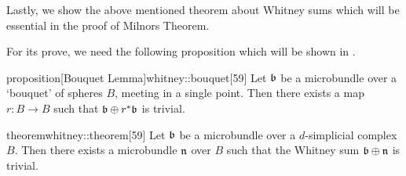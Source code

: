 \begin{myparagraph}
    Lastly, we show the above mentioned theorem about Whitney sums
    which will be essential in the proof of Milnors Theorem.

    For its prove, we need the following proposition
    which will be shown in .
\end{myparagraph}

\begin{mystatement}{proposition}[Bouquet Lemma]{whitney::bouquet}[59]
    Let $\bb$ be a microbundle over a `bouquet' of spheres $B$, meeting in a single point.
    Then there exists a map $r: B \to B$ such that $\whitney{\bb}{\ind{r}\bb}$ is trivial.
\end{mystatement}

\begin{mystatement}{theorem}{whitney::theorem}[59]
    Let $\bb$ be a microbundle over a $d$-simplicial complex $B$.
    Then there exists a microbundle $\mathfrak{n}$ over $B$ such that
    the Whitney sum $\whitney{\bb}{\bn}$ is trivial.
\end{mystatement}

